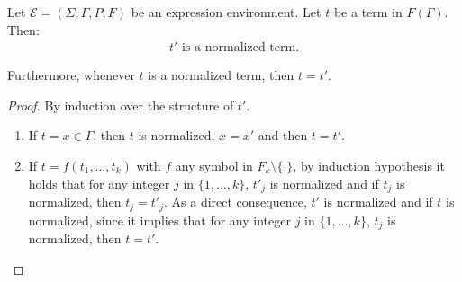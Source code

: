 \documentclass[a4paper]{llncs}
\begin{document}
  
  \begin{proposition}\label{prop t prim norm}
    Let $\mathcal{E}=(\Sigma,\Gamma,P,F)$ be an expression environment. Let $t$ be a term in $F(\Gamma)$. Then:
        \begin{align*}
        \text{$t'$ is a normalized term.} 
        \end{align*}   
    
    Furthermore, whenever $t$ is a normalized term, then $t=t'$.
  \end{proposition}
  \begin{proof}
    By induction over the structure of $t'$.
    \begin{enumerate}
      \item If $t=x\in\Gamma$, then $t$ is normalized, $x=x'$ and then $t=t'$.
    
      \item If $t=f(t_1,\ldots,t_k)$ with $f$ any symbol in $F_k\setminus\{\cdot\}$, by induction hypothesis it holds that for any integer $j$ in $\{1,\ldots,k\}$, $t'_j$ is normalized and if $t_j$ is normalized, then $t_j=t'_j$. As a direct consequence, $t'$ is normalized and if $t$ is normalized, since it implies that for any integer $j$ in $\{1,\ldots,k\}$, $t_j$ is normalized, then $t=t'$.
    

\end{enumerate}
\end{proof}
\end{document}
